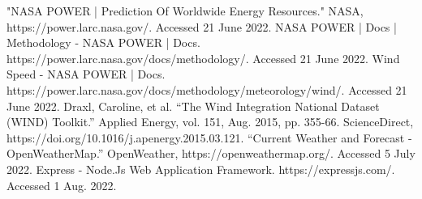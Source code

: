 \documentclass[12pt, oneside]{article}   	%
\begin{document}
\begin{thebibliography}{99}

	"NASA POWER | Prediction Of Worldwide Energy Resources." NASA,
	https://power.larc.nasa.gov/. Accessed 21 June 2022.
	NASA POWER | Docs | Methodology - NASA POWER | Docs.
	https://power.larc.nasa.gov/docs/methodology/. Accessed 21 June 2022.
	Wind Speed - NASA POWER | Docs.
	https://power.larc.nasa.gov/docs/methodology/meteorology/wind/. Accessed 21
	June 2022.
	Draxl, Caroline, et al. “The Wind Integration National Dataset (WIND)
	Toolkit.” Applied Energy, vol. 151, Aug. 2015, pp. 355-66. ScienceDirect,
	https://doi.org/10.1016/j.apenergy.2015.03.121.
	“Current Weather and Forecast - OpenWeatherMap.” OpenWeather,
	https://openweathermap.org/. Accessed 5 July 2022.
	Express - Node.Js Web Application Framework. https://expressjs.com/.
	Accessed 1 Aug. 2022.
\end{thebibliography}
\end{document}
